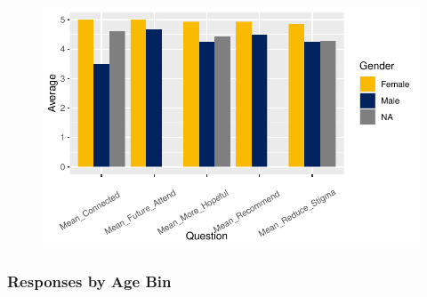 \documentclass[
  letterpaper,
  DIV=11,
  numbers=noendperiod]{scrartcl}
\begin{document}
\begin{figure}[H]

{\centering \includegraphics{ytp_post_event_survey_files/figure-pdf/unnamed-chunk-16-1.pdf}

}

\end{figure}

\hypertarget{responses-by-age-bin-1}{%
\subsubsection{Responses by Age Bin}\label{responses-by-age-bin-1}}
\end{document}
